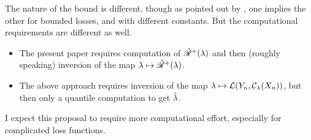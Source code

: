 \documentclass[twoside,11pt]{article}
\numberwithin{equation}{section}
\begin{document}
The nature of the bound is different, though as pointed out by
\citet{vovk:2012:conditionalconformal}, one implies the other for bounded
losses, and with different constants.  But the computational requirements are
different as well.
%
\begin{itemize}
%
\item The present paper requires computation of $\hat{\mathscr{R}}^{+}(\lambda)$ and then
(roughly speaking) inversion of the map $\lambda \mapsto \hat{\mathscr{R}}^{+}(\lambda)$.
%
\item The above approach requires inversion of the map $\lambda \mapsto
\mathcal{L}(Y_n, \mathcal{C}_\lambda(X_n))$, but then only a quantile computation
to get $\hat{\lambda}$.
%
\end{itemize}
%
I expect this proposal to require more computational effort, especially
for complicated loss functions.




\newpage

\printbibliography{}
\end{document}
